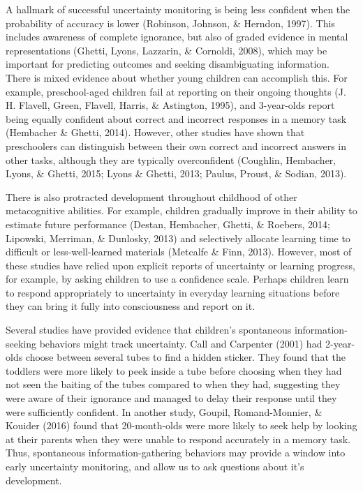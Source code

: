 \documentclass[10pt, letterpaper]{article}
\begin{document}
A hallmark of successful uncertainty monitoring is being less confident
when the probability of accuracy is lower (Robinson, Johnson, \&
Herndon, 1997). This includes awareness of complete ignorance, but also
of graded evidence in mental representations (Ghetti, Lyons, Lazzarin,
\& Cornoldi, 2008), which may be important for predicting outcomes and
seeking disambiguating information. There is mixed evidence about
whether young children can accomplish this. For example, preschool-aged
children fail at reporting on their ongoing thoughts (J. H. Flavell,
Green, Flavell, Harris, \& Astington, 1995), and 3-year-olds report
being equally confident about correct and incorrect responses in a
memory task (Hembacher \& Ghetti, 2014). However, other studies have
shown that preschoolers can distinguish between their own correct and
incorrect answers in other tasks, although they are typically
overconfident (Coughlin, Hembacher, Lyons, \& Ghetti, 2015; Lyons \&
Ghetti, 2013; Paulus, Proust, \& Sodian, 2013).

There is also protracted development throughout childhood of other
metacognitive abilities. For example, children gradually improve in
their ability to estimate future performance (Destan, Hembacher, Ghetti,
\& Roebers, 2014; Lipowski, Merriman, \& Dunlosky, 2013) and selectively
allocate learning time to difficult or less-well-learned materials
(Metcalfe \& Finn, 2013). However, most of these studies have relied
upon explicit reports of uncertainty or learning progress, for example,
by asking children to use a confidence scale. Perhaps children learn to
respond appropriately to uncertainty in everyday learning situations
before they can bring it fully into consciousness and report on it.

Several studies have provided evidence that children's spontaneous
information-seeking behaviors might track uncertainty. Call and
Carpenter (2001) had 2-year-olds choose between several tubes to find a
hidden sticker. They found that the toddlers were more likely to peek
inside a tube before choosing when they had not seen the baiting of the
tubes compared to when they had, suggesting they were aware of their
ignorance and managed to delay their response until they were
sufficiently confident. In another study, Goupil, Romand-Monnier, \&
Kouider (2016) found that 20-month-olds were more likely to seek help by
looking at their parents when they were unable to respond accurately in
a memory task. Thus, spontaneous information-gathering behaviors may
provide a window into early uncertainty monitoring, and allow us to ask
questions about it's development.
\end{document}
